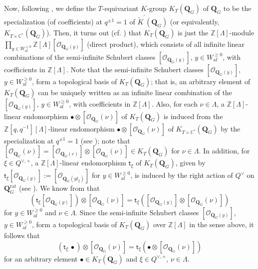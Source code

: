 \documentclass[11pt,a4paper,reqno,dvipdfmx]{amsart}
\numberwithin{equation}{section}
\newcommand{\BZ}{\mathbb{Z}}
\newcommand{\BC}{\mathbb{C}}
\newcommand{\CO}{\mathcal{O}}
\newcommand{\st}{\mathsf{t}}
\newcommand{\af}{\mathrm{af}}
\newcommand{\ti}[1]{\widetilde{#1}}
\newcommand{\QG}{\mathbf{Q}_{G}}
\newcommand{\QGr}{\mathbf{Q}_{G}^{\mathrm{rat}}}
\theoremstyle{plain}
\theoremstyle{definition}
\theoremstyle{remark}
\begin{document}
Now, following \cite[\S 1.5]{Kat2}, 
we define the $T$-equivariant $K$-group $K_{T}(\QG)$ of $\QG$ 
to be the specialization (of coefficients) at $q^{\pm 1} = 1$ of 
$\ti{K}^{\prime}(\QG)$ (or equivalently, $K_{T \times \BC^{\ast}}(\QG)$). 
Then, it turns out (cf. \cite[Lemma~1.22]{Kat2}) 
that $K_{T}(\QG)$ is just the $\BZ[\Lambda]$-module 
$\prod_{y \in W_{\af}^{\geq 0}} \BZ[\Lambda][\CO_{\QG(y)}]$ (direct product), 
which consists of all infinite linear combinations of 
the semi-infinite Schubert classes $[\CO_{\QG(y)}]$, $y \in W_{\af}^{\geq 0}$, 
with coefficients in $\BZ[\Lambda]$. 
Note that the semi-infinite Schubert classes $[\CO_{\QG(y)}]$, $y \in W_{\af}^{\geq 0}$, 
form a topological basis of $K_{T}(\QG)$; 
that is, an arbitrary element of $K_{T}(\QG)$ can be uniquely written 
as an infinite linear combination of the $[\CO_{\QG(y)}]$, $y \in W_{\af}^{\geq 0}$, 
with coefficients in $\BZ[\Lambda]$. Also, for each $\nu \in \Lambda$, 
a $\BZ[\Lambda]$-linear endomorphism $\bullet \otimes [\CO_{\QG}(\nu)]$ of $K_{T}(\QG)$ 
is induced from the $\BZ[q, q^{-1}][\Lambda]$-linear endomorphism 
$\bullet \otimes [\CO_{\QG}(\nu)]$ of $K_{T \times \BC^{\ast}}(\QG)$ 
by the specialization at $q^{\pm 1} = 1$ (see \cite[Theorem~1.26]{Kat2}); 
note that $[\CO_{\QG}(\nu)] = [\CO_{\QG(e)}] \otimes [\CO_{\QG}(\nu)] \in K_{T}(\QG)$ 
for $\nu \in \Lambda$. 
In addition, for $\xi \in Q^{\vee,+}$, a $\BZ[\Lambda]$-linear endomorphism 
$\st_{\xi}$ of $K_{T}(\QG)$, given by $\st_{\xi}[\CO_{\QG(y)}] := 
[\CO_{\QG(y t_{\xi})}]$ for $y \in W_{\af}^{\geq 0}$, 
is induced by the right action of $Q^{\vee}$ on $\QGr$ 
(see \cite[Eq.~(1.20)]{Kat2}). We know from \cite[Theorem~1.26]{Kat2} that 
%
\begin{equation}\label{eq:shift}
(\st_{\xi}[\CO_{\QG(y)}]) \otimes [\CO_{\QG}(\nu)] = 
\st_{\xi}([\CO_{\QG(y)}] \otimes [\CO_{\QG}(\nu)])
\end{equation}
%
for $y \in W_{\af}^{\geq 0}$ and $\nu \in \Lambda$. 
Since the semi-infinite Schubert classes $[\CO_{\QG(y)}]$, $y \in W_{\af}^{\geq 0}$, 
form a topological basis of $K_{T}(\QG)$ over $\BZ[\Lambda]$ in the sense above, 
it follows that
%
\begin{equation}
(\st_{\xi} \, \bullet) \otimes [\CO_{\QG}(\nu)] = 
\st_{\xi}(\bullet \otimes [\CO_{\QG}(\nu)])
\end{equation}
%
for an arbitrary element $\bullet \in K_{T}(\QG)$ and 
$\xi \in Q^{\vee,+}$, $\nu \in \Lambda$.

%
\end{document}
